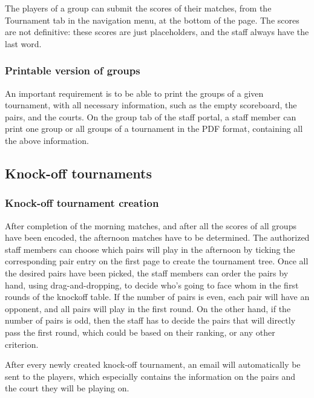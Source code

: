 The players of a group can submit the scores of their matches, from the
Tournament tab in the navigation menu, at the bottom of the page.
The scores are not definitive: these scores are just placeholders, and
the staff always have the last word.

\subsubsection{Printable version of groups}
\label{subs:Printable version of groups}


An important requirement is to be able to print the groups of a given
tournament, with all necessary information, such as the empty scoreboard, the
pairs, and the courts. On the group tab of the staff portal, a staff member can
print one group or all groups of a tournament in the PDF format, containing
all the above information.

\subsection{Knock-off tournaments}
\label{sub:Knock-off tournaments}

\subsubsection{Knock-off tournament creation}
\label{subs:Knock-off tournament creation}


After completion of the morning matches, and after all the scores of all groups
have been encoded, the afternoon matches have to be determined.
The authorized staff members can choose which pairs will play
in the afternoon by ticking the corresponding pair entry on the first page
to create the tournament tree. Once all the desired pairs have been picked,
the staff members can order the pairs by hand, using drag-and-dropping,
to decide who's going to face whom in the first rounds of the knockoff table.
If the number of pairs is even, each pair will have an opponent, and all pairs
will play in the first round. On the other hand, if the number of pairs is odd,
then the staff has to decide the pairs that will directly pass
the first round, which could be based on their ranking, or any other criterion.
\newline

After every newly created knock-off tournament, an email will automatically be
sent to the players, which especially contains the information on the pairs and
the court they will be playing on.

